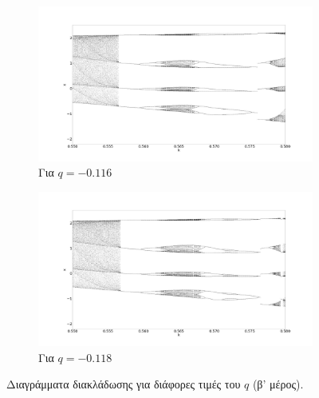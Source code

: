 \begin{figure}[ht]
	\centering
	\begin{subfigure}[b]{1\textwidth}
		\centering
		\includegraphics[width=\textwidth]{LateX images/graphs/g5}
		\caption{Για $q=-0.116$}
		\label{f:g5}
	\end{subfigure}
	\hfill
	\begin{subfigure}[b]{1\textwidth}
		\centering
		\includegraphics[width=\textwidth]{LateX images/graphs/g6}
		\caption{Για $q=-0.118$}
		\label{f:g6}
	\end{subfigure}
	
	\caption{Διαγράμματα διακλάδωσης για διάφορες τιμές του $q$ (β' μέρος). }
	\label{f:g2}
\end{figure}




